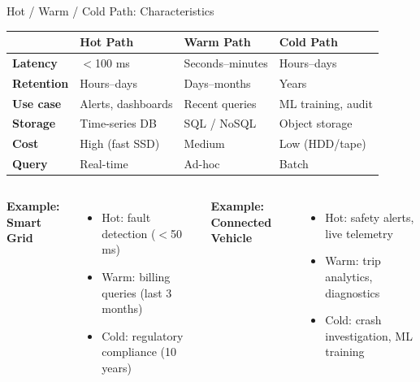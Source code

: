 \documentclass[aspectratio=169,11pt]{beamer}
\begin{document}
\begin{frame}{Hot / Warm / Cold Path: Characteristics}
    \vspace{0.1cm}
    \begin{center}
    \footnotesize
    \begin{tabular}{p{2cm}p{3cm}p{3cm}p{3.5cm}}
        \toprule
        & \textbf{Hot Path} & \textbf{Warm Path} & \textbf{Cold Path} \\
        \midrule
        \textbf{Latency} & $<$100 ms & Seconds--minutes & Hours--days \\
        \textbf{Retention} & Hours--days & Days--months & Years \\
        \textbf{Use case} & Alerts, dashboards & Recent queries & ML training, audit \\
        \textbf{Storage} & Time-series DB & SQL / NoSQL & Object storage \\
        \textbf{Cost} & High (fast SSD) & Medium & Low (HDD/tape) \\
        \textbf{Query} & Real-time & Ad-hoc & Batch \\
        \bottomrule
    \end{tabular}
    \normalsize
    \end{center}

    \vspace{0.15cm}
    \begin{columns}
        \textbf{Example: Smart Grid}
        \begin{itemize}
            \item Hot: fault detection ($<$50 ms)
            \item Warm: billing queries (last 3 months)
            \item Cold: regulatory compliance (10 years)
        \end{itemize}

        \textbf{Example: Connected Vehicle}
        \begin{itemize}
            \item Hot: safety alerts, live telemetry
            \item Warm: trip analytics, diagnostics
            \item Cold: crash investigation, ML training
        \end{itemize}
    \end{columns}
\end{frame}

\end{document}
